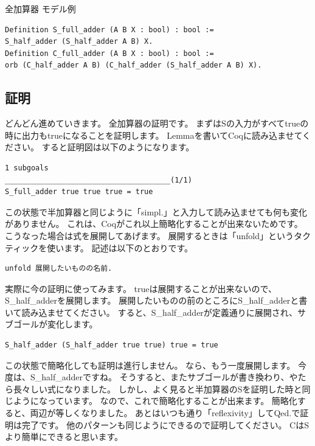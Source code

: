 \documentclass{jsbook}
\begin{document}
\begin{itembox}[l]{全加算器 モデル例}
\begin{verbatim}
Definition S_full_adder (A B X : bool) : bool :=
S_half_adder (S_half_adder A B) X.
Definition C_full_adder (A B X : bool) : bool :=
orb (C_half_adder A B) (C_half_adder (S_half_adder A B) X).
\end{verbatim}
\end{itembox}

\subsection*{証明}
どんどん進めていきます。
全加算器の証明です。
まずはSの入力がすべてtrueの時に出力もtrueになることを証明します。
Lemmaを書いてCoqに読み込ませてください。
すると証明図は以下のようになります。
\begin{verbatim}
1 subgoals
______________________________________(1/1)
S_full_adder true true true = true
\end{verbatim}
この状態で半加算器と同じように「simpl.」と入力して読み込ませても何も変化がありません。
これは、Coqがこれ以上簡略化することが出来ないためです。
こうなった場合は式を展開してあげます。
展開するときは「unfold」というタクティックを使います。
記述は以下のとおりです。
\begin{verbatim}
unfold 展開したいものの名前.
\end{verbatim}

実際に今の証明に使ってみます。
trueは展開することが出来ないので、S\_half\_adderを展開します。
展開したいものの前のところにS\_half\_adderと書いて読み込ませてください。
すると、S\_half\_adderが定義通りに展開され、サブゴールが変化します。
\begin{verbatim}
S_half_adder (S_half_adder true true) true = true
\end{verbatim}
この状態で簡略化しても証明は進行しません。
なら、もう一度展開します。
今度は、S\_half\_adderですね。
そうすると、またサブゴールが書き換わり、やたら長々しい式になりました。
しかし、よく見ると半加算器のSを証明した時と同じようになっています。
なので、これで簡略化することが出来ます。
簡略化すると、両辺が等しくなりました。
あとはいつも通り「reflexivity」してQed.で証明は完了です。
他のパターンも同じようにできるので証明してください。
CはSより簡単にできると思います。
\end{document}
